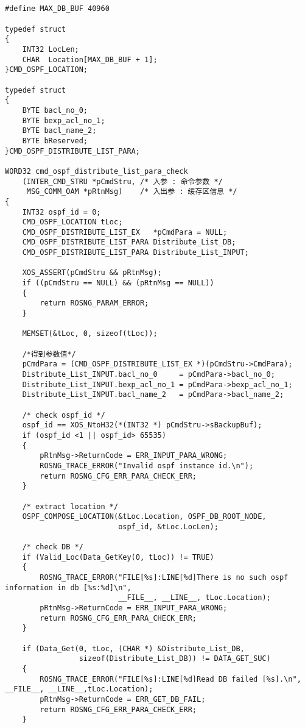﻿\documentclass  [11pt,onecolumn]{article}
\begin{document}
\pagebreak
\subsection{}

\begin{lstlisting}
#define MAX_DB_BUF 40960

typedef struct
{
    INT32 LocLen;
    CHAR  Location[MAX_DB_BUF + 1]; 
}CMD_OSPF_LOCATION;

typedef struct 
{
    BYTE bacl_no_0;
    BYTE bexp_acl_no_1;
    BYTE bacl_name_2;
    BYTE bReserved;
}CMD_OSPF_DISTRIBUTE_LIST_PARA;

WORD32 cmd_ospf_distribute_list_para_check
    (INTER_CMD_STRU *pCmdStru, /* 入参 : 命令参数 */
     MSG_COMM_OAM *pRtnMsg)    /* 入出参 : 缓存区信息 */
{
    INT32 ospf_id = 0;    
    CMD_OSPF_LOCATION tLoc;
    CMD_OSPF_DISTRIBUTE_LIST_EX   *pCmdPara = NULL;
    CMD_OSPF_DISTRIBUTE_LIST_PARA Distribute_List_DB;
    CMD_OSPF_DISTRIBUTE_LIST_PARA Distribute_List_INPUT;

    XOS_ASSERT(pCmdStru && pRtnMsg);
    if ((pCmdStru == NULL) && (pRtnMsg == NULL))
    {
        return ROSNG_PARAM_ERROR;
    }
    
    MEMSET(&tLoc, 0, sizeof(tLoc));
    
    /*得到参数值*/
    pCmdPara = (CMD_OSPF_DISTRIBUTE_LIST_EX *)(pCmdStru->CmdPara);    
    Distribute_List_INPUT.bacl_no_0     = pCmdPara->bacl_no_0;
    Distribute_List_INPUT.bexp_acl_no_1 = pCmdPara->bexp_acl_no_1;
    Distribute_List_INPUT.bacl_name_2   = pCmdPara->bacl_name_2;
    
    /* check ospf_id */
    ospf_id == XOS_NtoH32(*(INT32 *) pCmdStru->sBackupBuf);
    if (ospf_id <1 || ospf_id> 65535)
    {
        pRtnMsg->ReturnCode = ERR_INPUT_PARA_WRONG;
        ROSNG_TRACE_ERROR("Invalid ospf instance id.\n");
        return ROSNG_CFG_ERR_PARA_CHECK_ERR;
    }

    /* extract location */
    OSPF_COMPOSE_LOCATION(&tLoc.Location, OSPF_DB_ROOT_NODE,
                          ospf_id, &tLoc.LocLen);
    
    /* check DB */
    if (Valid_Loc(Data_GetKey(0, tLoc)) != TRUE)
    {
        ROSNG_TRACE_ERROR("FILE[%s]:LINE[%d]There is no such ospf information in db [%s:%d]\n",
                          __FILE__, __LINE__, tLoc.Location);
        pRtnMsg->ReturnCode = ERR_INPUT_PARA_WRONG;
        return ROSNG_CFG_ERR_PARA_CHECK_ERR;
    }

    if (Data_Get(0, tLoc, (CHAR *) &Distribute_List_DB,
                 sizeof(Distribute_List_DB)) != DATA_GET_SUC)
    {
        ROSNG_TRACE_ERROR("FILE[%s]:LINE[%d]Read DB failed [%s].\n", __FILE__, __LINE__,tLoc.Location);
        pRtnMsg->ReturnCode = ERR_GET_DB_FAIL;
        return ROSNG_CFG_ERR_PARA_CHECK_ERR;
    }


\end{lstlisting}
\end{document}
